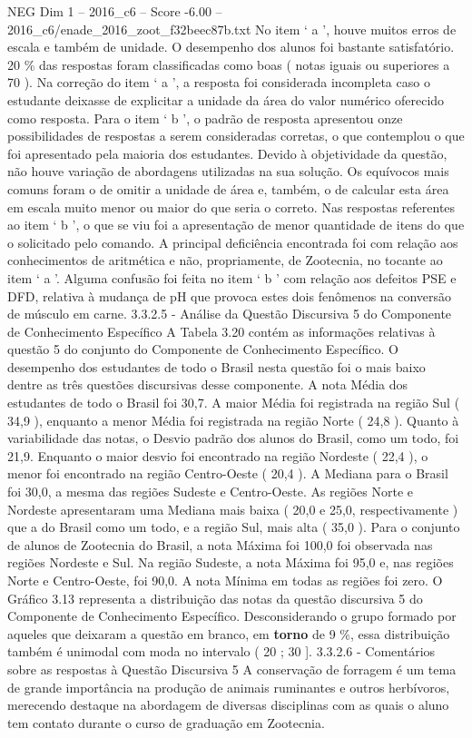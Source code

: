 \begin{textsample}{NEG Dim 1 – 2016\_c6 – Score -6.00 – 2016\_c6/enade\_2016\_zoot\_f32beec87b.txt}
No item ‘ a ’, houve muitos erros de escala e também de unidade.
O desempenho dos alunos foi bastante satisfatório. 20 \% das respostas foram classificadas como boas ( notas iguais ou superiores a 70 ).
Na correção do item ‘ a ’, a resposta foi considerada incompleta caso o estudante deixasse de explicitar a unidade da área do valor numérico oferecido como resposta.
Para o item ‘ b ’, o padrão de resposta apresentou onze possibilidades de respostas a serem consideradas corretas, o que contemplou o que foi apresentado pela maioria dos estudantes.
Devido à objetividade da questão, não houve variação de abordagens utilizadas na sua solução.
Os equívocos mais comuns foram o de omitir a unidade de área e, também, o de calcular esta área em escala muito menor ou maior do que seria o correto.
Nas respostas referentes ao item ‘ b ’, o que se viu foi a apresentação de menor quantidade de itens do que o solicitado pelo comando.
A principal deficiência encontrada foi com relação aos conhecimentos de aritmética e não, propriamente, de Zootecnia, no tocante ao item ‘ a ’.
Alguma confusão foi feita no item ‘ b ’ com relação aos defeitos PSE e DFD, relativa à mudança de pH que provoca estes dois fenômenos na conversão de músculo em carne. 3.3.2.5 - Análise da Questão Discursiva 5 do Componente de Conhecimento Específico A Tabela 3.20 contém as informações relativas à questão 5 do conjunto do Componente de Conhecimento Específico.
O desempenho dos estudantes de todo o Brasil nesta questão foi o mais baixo dentre as três questões discursivas desse componente.
A nota Média dos estudantes de todo o Brasil foi 30,7.
A maior Média foi registrada na região Sul ( 34,9 ), enquanto a menor Média foi registrada na região Norte ( 24,8 ).
Quanto à variabilidade das notas, o Desvio padrão dos alunos do Brasil, como um todo, foi 21,9.
Enquanto o maior desvio foi encontrado na região Nordeste ( 22,4 ), o menor foi encontrado na região Centro-Oeste ( 20,4 ).
A Mediana para o Brasil foi 30,0, a mesma das regiões Sudeste e Centro-Oeste.
As regiões Norte e Nordeste apresentaram uma Mediana mais baixa ( 20,0 e 25,0, respectivamente ) que a do Brasil como um todo, e a região Sul, mais alta ( 35,0 ).
Para o conjunto de alunos de Zootecnia do Brasil, a nota Máxima foi 100,0 foi observada nas regiões Nordeste e Sul.
Na região Sudeste, a nota Máxima foi 95,0 e, nas regiões Norte e Centro-Oeste, foi 90,0.
A nota Mínima em todas as regiões foi zero.
O Gráfico 3.13 representa a distribuição das notas da questão discursiva 5 do Componente de Conhecimento Específico.
Desconsiderando o grupo formado por aqueles que deixaram a questão em branco, em \textbf{torno} de 9 \%, essa distribuição também é unimodal com moda no intervalo ( 20 ; 30 ]. 3.3.2.6 - Comentários sobre as respostas à Questão Discursiva 5 A conservação de forragem é um tema de grande importância na produção de animais ruminantes e outros herbívoros, merecendo destaque na abordagem de diversas disciplinas com as quais o aluno tem contato durante o curso de graduação em Zootecnia.

\end{textsample}
